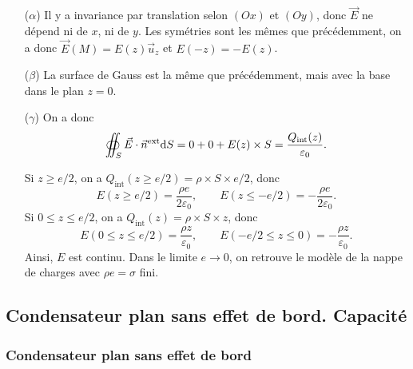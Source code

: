                 \begin{enumerate}
                    \item [($\alpha$)] Il y a invariance par translation selon $(Ox)$ et $(Oy)$, donc $\vec{E}$ ne dépend ni de $x$, ni de $y$. Les symétries sont les mêmes que précédemment, on a donc $\vec{E}(M)=E(z)\vec{u}_z$ et $E(-z)=-E(z)$.
                    \item [($\beta$)] La surface de Gauss est la même que précédemment, mais avec la base dans le plan $z=0$.
                    \item [($\gamma$)] On a donc 
                    \begin{equation}
                        \oiint_{S}\vec{E}\cdot\vec{n}^{\text{ext}}\mathrm{d} S=0+0+E(z)\times S=\frac{Q_{\text{int}}(z)}{\varepsilon_0}.
                    \end{equation}

                    Si $z\geqslant e/2$, on a $Q_{\text{int}}(z\geqslant e/2)=\rho\times S\times e/2$, donc 
                    \begin{equation}
                        \boxed{
                        E(z\geqslant e/2)=\frac{\rho e}{2\varepsilon_0},\qquad E(z\leqslant -e/2)=-\frac{\rho e}{2\varepsilon_0}.}
                    \end{equation}
                    Si $0\leqslant z\leqslant e/2$, on a $Q_{\text{int}}(z)=\rho\times S\times z$, donc 
                    \begin{equation}
                        \boxed{
                        E(0\leqslant z\leqslant e/2)=\frac{\rho z}{\varepsilon_0},\qquad E(-e/2\leqslant z\leqslant 0)=-\frac{\rho z}{\varepsilon_0}.}
                    \end{equation}
                    Ainsi, $E$ est continu. Dans le limite $e\to0$, on retrouve le modèle de la nappe de charges avec $\rho e=\sigma$ fini.
                \end{enumerate}

    \subsection{Condensateur plan sans effet de bord. Capacité}
        \subsubsection{Condensateur plan sans effet de bord}

